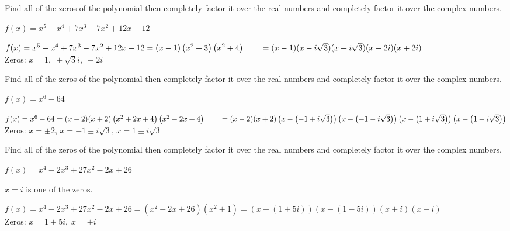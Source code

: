 \documentclass{ximera}
\begin{document}
\begin{problem}
Find all of the zeros of the polynomial then completely factor it over the real numbers and completely factor it over the complex numbers.

$f(x) = x^5 - x^4+7x^3-7x^2+12x-12$

\begin{solution}
$f(x) = x^5 - x^4+7x^3-7x^2+12x-12 = (x-1) \left(x^2 + 3\right) \left(x^2 + 4 \right) \\
\phantom{f(x)} = (x-1)(x - i \sqrt{3})(x + i \sqrt{3})(x-2i)(x+2i)$ \\
Zeros:  $x = 1, \;  \pm  \sqrt{3}i,  \; \pm 2i$
\end{solution}

\end{problem}

\begin{problem}
Find all of the zeros of the polynomial then completely factor it over the real numbers and completely factor it over the complex numbers.

$f(x) = x^6-64$

\begin{solution}
$f(x) = x^6 - 64 = (x-2)(x+2)\left(x^2+2x+4\right)\left(x^2-2x+4\right) \\
      \phantom{f(x)} = (x-2)(x+2)\left( x - \left( -1+i\sqrt{3} \right) \right)\left( x - \left( -1-i\sqrt{3} \right) \right)\left( x - \left( 1+i\sqrt{3} \right) \right)\left( x - \left( 1-i\sqrt{3} \right) \right)$ \\
Zeros:  $x = \pm 2$, $x = -1 \pm i\sqrt{3}$, $x = 1 \pm i\sqrt{3}$
\end{solution}

\end{problem}

\begin{problem}
Find all of the zeros of the polynomial then completely factor it over the real numbers and completely factor it over the complex numbers.

$f(x) = x^{4} - 2x^{3} + 27x^{2} - 2x + 26$

\begin{hint}
$x = i$ is one of the zeros.  
\end{hint}

\begin{solution}
$f(x) = x^{4} - 2x^{3} + 27x^{2} - 2x + 26 = (x^{2} - 2x + 26)(x^{2} + 1) = (x - (1 + 5i))(x - (1 - 5i))(x + i)(x - i)$\\ 
Zeros: $x = 1 \pm 5i, \; x = \pm i$
\end{solution}
\end{problem}
\end{document}
